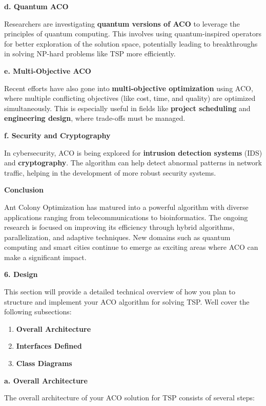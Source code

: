 \documentclass[
]{article}
\begin{document}
\textbf{d. Quantum ACO}

Researchers are investigating \textbf{quantum versions of ACO} to
leverage the principles of quantum computing. This involves using
quantum-inspired operators for better exploration of the solution space,
potentially leading to breakthroughs in solving NP-hard problems like
TSP more efficiently.

\textbf{e. Multi-Objective ACO}

Recent efforts have also gone into \textbf{multi-objective optimization}
using ACO, where multiple conflicting objectives (like cost, time, and
quality) are optimized simultaneously. This is especially useful in
fields like \textbf{project scheduling} and \textbf{engineering design},
where trade-offs must be managed.

\textbf{f. Security and Cryptography}

In cybersecurity, ACO is being explored for \textbf{intrusion detection
systems} (IDS) and \textbf{cryptography}. The algorithm can help detect
abnormal patterns in network traffic, helping in the development of more
robust security systems.

\textbf{Conclusion}

Ant Colony Optimization has matured into a powerful algorithm with
diverse applications ranging from telecommunications to bioinformatics.
The ongoing research is focused on improving its efficiency through
hybrid algorithms, parallelization, and adaptive techniques. New domains
such as quantum computing and smart cities continue to emerge as
exciting areas where ACO can make a significant impact.

\textbf{6. Design}

This section will provide a detailed technical overview of how you plan
to structure and implement your ACO algorithm for solving TSP.
We\textquotesingle ll cover the following subsections:

\begin{enumerate}
\def\labelenumi{\arabic{enumi}.}
\item
  \textbf{Overall Architecture}
\item
  \textbf{Interfaces Defined}
\item
  \textbf{Class Diagrams}
\end{enumerate}

\textbf{a. Overall Architecture}

The overall architecture of your ACO solution for TSP consists of
several steps:
\end{document}
